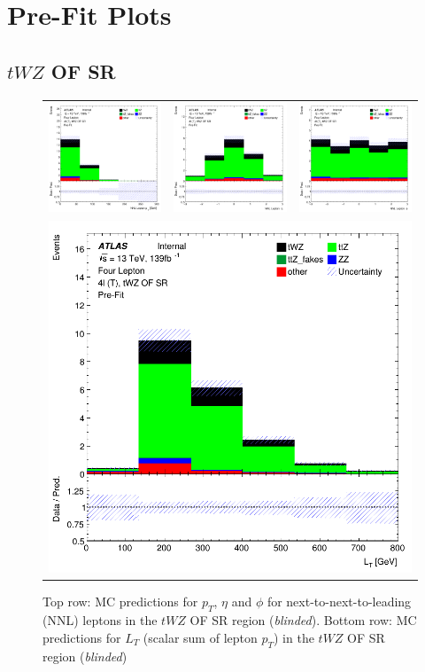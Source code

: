  
\section{Pre-Fit Plots}
\label{sec:app-controlPlots}


\subsection{$tWZ$ OF SR}
\label{sec:app-controlplotstetralepton-tWZ-OF-SR}

\begin{figure}[htbp]
  \centering
  \begin{tabular}{ccc}



    \includegraphics[width=.2\textwidth]{figures/PreFitPlots/lep4_tWZ_4T_OF_NNL_lepton_pt} &
    \includegraphics[width=.2\textwidth]{figures/PreFitPlots/lep4_tWZ_4T_OF_NNL_lepton_eta} &
    \includegraphics[width=.2\textwidth]{figures/PreFitPlots/lep4_tWZ_4T_OF_NNL_lepton_phi} \\
    \multicolumn{3}{c}{\includegraphics[width=.2\textwidth]{figures/PreFitPlots/lep4_tWZ_4T_OF_LT} }\\

  \end{tabular}
  \caption{Top row: MC predictions for $p_{T}$, $\eta$ and $\phi$ for next-to-next-to-leading (NNL) leptons in the $tWZ$ OF SR region (\textit{blinded}). Bottom row: MC predictions for $L_{T}$ (scalar sum of lepton $p_{T}$)  in the $tWZ$ OF SR region (\textit{blinded})}
  \label{fig:4lep-OF-SR-leptonPlots}
\end{figure}



